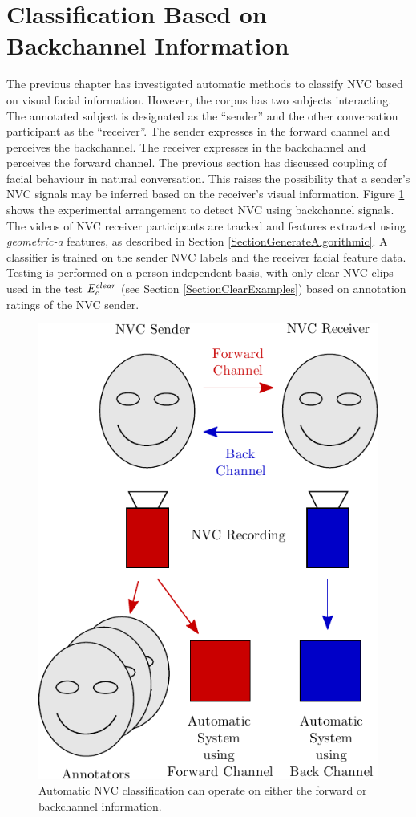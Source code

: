 \section{Classification Based on Backchannel Information}
\label{SectionClassificationBackchannel}

The previous chapter has investigated automatic methods to classify \ac{NVC} based on visual facial information. However, the corpus has two subjects interacting. The annotated subject is designated as the ``sender'' and the other conversation participant as the ``receiver''. 
The sender expresses in the forward channel and perceives the backchannel. The receiver expresses in the backchannel and perceives the forward channel. 
The previous section has discussed coupling of facial behaviour in natural conversation. This raises the possibility that a sender's \ac{NVC} signals may be inferred based on the receiver's visual information. Figure \ref{BackChannelFigure} shows the experimental arrangement to detect \ac{NVC} using backchannel signals. The videos of \ac{NVC} receiver participants are tracked and features extracted using \textit{geometric-a} features, as described in Section \ref{SectionGenerateAlgorithmic}. A classifier is trained on the sender \ac{NVC} labels and the receiver facial feature data. Testing is performed on a person independent basis, with only clear \ac{NVC} clips used in the test $E^{clear}_{c}$ (see Section \ref{SectionClearExamples}) based on annotation ratings of the \ac{NVC} sender. %

\begin{figure}[tb]
\centering
\includegraphics[width = 0.4 \columnwidth]{backchannel/figureforwardbackchannel.pdf}
\caption{Automatic \ac{NVC} classification can operate on either the forward or backchannel information.}
\label{BackChannelFigure}
\end{figure}

